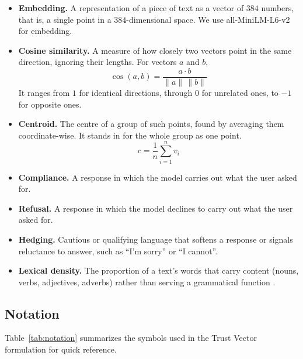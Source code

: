 \documentclass[conference]{IEEEtran}
\begin{document}
\begin{itemize}
    \item \textbf{Embedding.} A representation of a piece of text as a vector of $384$ numbers, that is, a single point in a $384$-dimensional space. We use all-MiniLM-L6-v2 \cite{ref40} for embedding.
    
    \item \textbf{Cosine similarity.} A measure of how closely two vectors point in the same direction, ignoring their lengths. For vectors $a$ and $b$,
    \begin{equation}
    \cos(a, b) = \frac{a \cdot b}{\|a\|\,\|b\|}
    \label{eq:cosine}
    \end{equation}
    It ranges from $1$ for identical directions, through $0$ for unrelated ones, to $-1$ for opposite ones. 
    
    \item \textbf{Centroid.} The centre of a group of such points, found by averaging them coordinate-wise. It stands in for the whole group as one point.
    \begin{equation}
    c = \frac{1}{n}\sum_{i=1}^{n} v_i
    \label{eq:centroid}
    \end{equation}
    
    \item \textbf{Compliance.} A response in which the model carries out what the user asked for.
    
    \item \textbf{Refusal.} A response in which the model declines to carry out what the user asked for.
    
    \item \textbf{Hedging.} Cautious or qualifying language that softens a response or signals reluctance to answer, such as ``I'm sorry'' or ``I cannot''.
    
    \item \textbf{Lexical density.} The proportion of a text's words that carry content (nouns, verbs, adjectives, adverbs) rather than serving a grammatical function \cite{ref41}.
\end{itemize}

\subsection{Notation}

Table~\ref{tab:notation} summarizes the symbols used in the Trust Vector formulation for quick reference.
\end{document}
